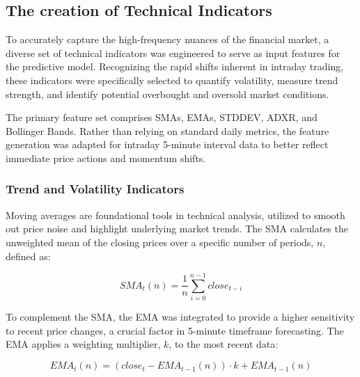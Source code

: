 \documentclass{ieeeaccess}
\begin{document}
\subsection{The creation of Technical Indicators}

To accurately capture the high-frequency nuances of the financial market, a diverse set of technical indicators was engineered to serve as input features for the predictive model. Recognizing the rapid shifts inherent in intraday trading, these indicators were specifically selected to quantify volatility, measure trend strength, and identify potential overbought and oversold market conditions.

The primary feature set comprises SMAs, EMAs, STDDEV, ADXR, and Bollinger Bands. Rather than relying on standard daily metrics, the feature generation was adapted for intraday 5-minute interval data to better reflect immediate price actions and momentum shifts.


\subsubsection{Trend and Volatility Indicators}

Moving averages are foundational tools in technical analysis, utilized to smooth out price noise and highlight underlying market trends. The SMA calculates the unweighted mean of the closing prices over a specific number of periods, $n$, defined as:

\begin{equation}
SMA_{t}(n) = \frac{1}{n}\sum_{i=0}^{n-1}close_{t-i}
\label{eq:sma}
\end{equation}

To complement the SMA, the EMA was integrated to provide a higher sensitivity to recent price changes, a crucial factor in 5-minute timeframe forecasting. The EMA applies a weighting multiplier, $k$, to the most recent data:

\begin{equation}
EMA_{t}(n) = (close_{t}-EMA_{t-1}(n))\cdot k+EMA_{t-1}(n)
\label{eq:ema}
\end{equation}
\end{document}
